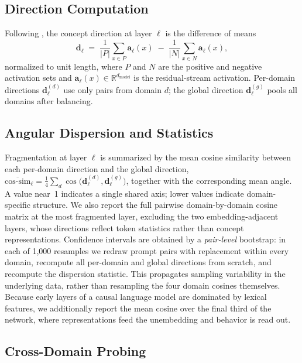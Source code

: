 \documentclass[11pt]{article}
\newcommand{\cosim}{\text{cos-sim}}
\newcommand{\dmodel}{d_{\text{model}}}
\newcommand{\vdir}{\mathbf{d}}
\newcommand{\vact}{\mathbf{a}}
\newcommand{\R}{\mathbb{R}}
\begin{document}
\subsection{Direction Computation}
\label{sec:directions}

Following \citet{zou2023representation}, the concept direction at layer
$\ell$ is the difference of means
\begin{equation}
  \vdir_\ell \;=\;
  \frac{1}{|P|}\sum_{x \in P} \vact_\ell(x)
  \;-\;
  \frac{1}{|N|}\sum_{x \in N} \vact_\ell(x),
\end{equation}
normalized to unit length, where $P$ and $N$ are the positive and negative
activation sets and $\vact_\ell(x) \in \R^{\dmodel}$ is the residual-stream
activation. Per-domain directions $\vdir_\ell^{(d)}$ use only pairs from
domain $d$; the global direction $\vdir_\ell^{(g)}$ pools all domains after
balancing.

\subsection{Angular Dispersion and Statistics}
\label{sec:angular}

Fragmentation at layer $\ell$ is summarized by the mean cosine similarity
between each per-domain direction and the global direction,
$\overline{\cosim}_\ell = \tfrac{1}{4}\sum_d
\cos\!\big(\vdir_\ell^{(d)}, \vdir_\ell^{(g)}\big)$,
together with the corresponding mean angle. A value near~1 indicates a
single shared axis; lower values indicate domain-specific structure. We also
report the full pairwise domain-by-domain cosine matrix at the most
fragmented layer, excluding the two embedding-adjacent layers, whose
directions reflect token statistics rather than concept representations.
Confidence intervals are obtained by a \emph{pair-level} bootstrap: in each
of 1{,}000 resamples we redraw prompt pairs with replacement within every
domain, recompute all per-domain and global directions from scratch, and
recompute the dispersion statistic. This propagates sampling variability in
the underlying data, rather than resampling the four domain cosines
themselves. Because early layers of a causal language model are dominated by
lexical features, we additionally report the mean cosine over the final
third of the network, where representations feed the unembedding and
behavior is read out.

\subsection{Cross-Domain Probing}
\label{sec:probe-method}
\end{document}
